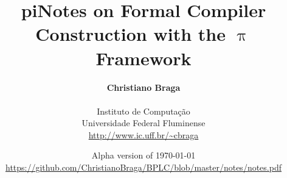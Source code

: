 \documentclass[a4paper,openany]{book}
\title{pi}
\begin{document}
\title{Notes on Formal Compiler Construction with the $\uppi$ Framework}


\author{\textbf{Christiano Braga}\\\\Instituto de Computa\c{c}\~ao\\Universidade Federal Fluminense\\\url{http://www.ic.uff.br/~cbraga}}

\date{Alpha version of \today\\\url{https://github.com/ChristianoBraga/BPLC/blob/master/notes/notes.pdf}}

\maketitle









\tableofcontents
\end{document}
